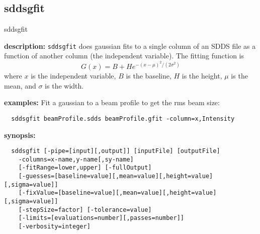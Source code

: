 \newpage
\subsection{sddsgfit}
\label{sddsgfit}

\begin{sddsprog}{sddsgfit}
  \item \textbf{description:}
  \verb|sddsgfit| does gaussian fits to a single column of an SDDS file as a function of another column
  (the independent variable). The fitting function is
  \[
    G(x) = B + H e^{-(x-\mu)^2/(2\sigma^2)}
  \]
  where $x$ is the independent variable, $B$ is the baseline, $H$ is the height, $\mu$ is the mean, and
  $\sigma$ is the width.

  \item \textbf{examples:}
  Fit a gaussian to a beam profile to get the rms beam size:
  \begin{verbatim}
  sddsgfit beamProfile.sdds beamProfile.gfit -column=x,Intensity
  \end{verbatim}

  \item \textbf{synopsis:}
  \begin{verbatim}
  sddsgfit [-pipe=[input][,output]] [inputFile] [outputFile]
    -columns=x-name,y-name[,sy-name]
    [-fitRange=lower,upper] [-fullOutput]
    [-guesses=[baseline=value][,mean=value][,height=value][,sigma=value]]
    [-fixValue=[baseline=value][,mean=value][,height=value][,sigma=value]]
    [-stepSize=factor] [-tolerance=value]
    [-limits=[evaluations=number][,passes=number]]
    [-verbosity=integer]
  \end{verbatim}


\end{sddsprog}
